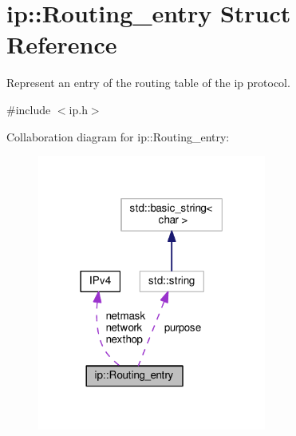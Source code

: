 \hypertarget{structip_1_1Routing__entry}{}\section{ip\+:\+:Routing\+\_\+entry Struct Reference}
\label{structip_1_1Routing__entry}


Represent an entry of the routing table of the ip protocol.  




{\ttfamily \#include $<$ip.\+h$>$}



Collaboration diagram for ip\+:\+:Routing\+\_\+entry\+:\nopagebreak
\begin{figure}[H]
\begin{center}
\leavevmode
\includegraphics[width=213pt]{structip_1_1Routing__entry__coll__graph}
\end{center}
\end{figure}

